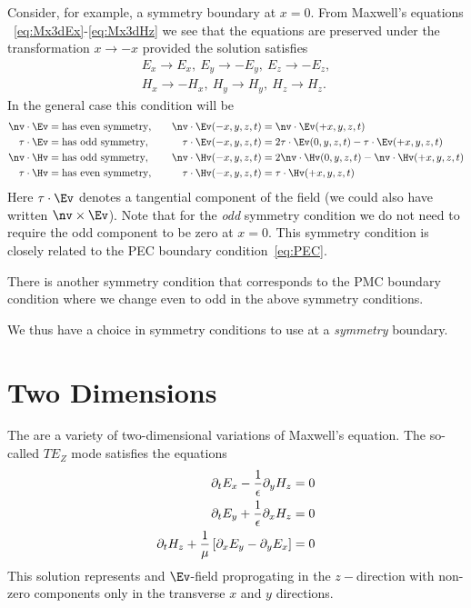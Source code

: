\documentclass[10pt]{article}
\begin{document}
Consider, for example, a symmetry boundary at $x=0$. 
% 
% 
From Maxwell's equations ~\eqref{eq:Mx3dEx}-\eqref{eq:Mx3dHz} we see that the equations are preserved under the
transformation $x \rightarrow -x$ provided the solution satisfies 
\begin{align*}
  E_x \rightarrow E_x,~ E_y \rightarrow -E_y, ~E_z \rightarrow -E_z, \\
  H_x \rightarrow -H_x,~ H_y \rightarrow H_y, ~H_z \rightarrow H_z .
\end{align*}
In the general case this condition will be 
\begin{alignat}{3}
   \nv\cdot\Ev & = \text{has even symmetry},\quad &\nv\cdot\Ev(-x,y,z,t) & =\nv\cdot\Ev(+x,y,z,t) \\
   \tau\cdot\Ev &= \text{has odd symmetry},   &\tau\cdot\Ev(-x,y,z,t) & =2\tau\cdot\Ev(0,y,z,t) - \tau\cdot\Ev(+x,y,z,t)               \\
   \nv\cdot\Hv & = \text{has odd  symmetry},  &\nv\cdot\Hv(-x,y,z,t) & =2\nv\cdot\Hv(0,y,z,t) - \nv\cdot\Hv(+x,y,z,t) \\
   \tau\cdot\Hv &= \text{has even symmetry},  & \tau\cdot\Hv(-x,y,z,t)& =\tau\cdot\Hv(+x,y,z,t)               
\end{alignat}
Here $\tau\cdot\Ev$ denotes a tangential component of the field (we could also have written $\nv\times\Ev$).
Note that for the {\em odd} symmetry condition we do not need to require the odd component to be zero at $x=0$.
This symmetry condition is closely related to the PEC boundary condition~\eqref{eq:PEC}.


There is another symmetry condition that corresponds to the PMC boundary condition where we change even to odd
in the above symmetry conditions. 

We thus have a choice in symmetry conditions to use at a {\em symmetry} boundary. 


\section{Two Dimensions}

The are a variety of two-dimensional variations of Maxwell's equation.
The so-called  $TE_Z$ mode satisfies the equations
\begin{align*}
\partial_t E_x - {1\over \epsilon} \partial_y H_z &=0 \\
\partial_t E_y + {1\over \epsilon} \partial_x H_z &=0 \\
\partial_t H_z + {1\over \mu } \left[ \partial_x E_y - \partial_y E_x \right] &=0 
\end{align*}
This solution represents and $\Ev$-field proprogating in the $z-$direction with 
non-zero components only in the transverse $x$ and $y$ directions.
\end{document}
